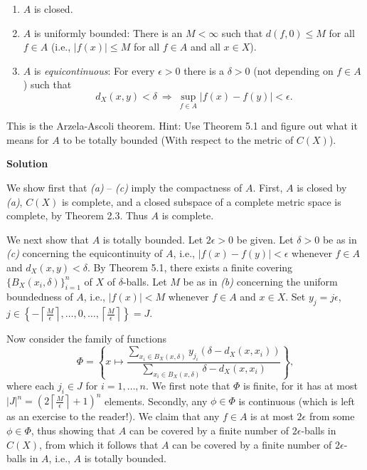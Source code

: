 \documentclass{article}
\begin{document}
\begin{enumerate}
{\begin{enumerate}
\item \(A\) is closed.
\item \(A\) is uniformly bounded:  There is an \(M < \infty\) such that \(d(f,0) \leq M\) for all \(f \in A\) (i.e., \(|f(x)| \leq M\) for all \(f \in A\) and all \(x \in X\)).
\item \(A\) is {\em equicontinuous}:  For every \(\epsilon > 0\) there is a \(\delta > 0\) (not depending on \(f \in A\)) such that
\[d_X(x,y) < \delta \ \Rightarrow \ \sup_{f \in A} |f(x) - f(y)| < \epsilon.\]
\end{enumerate}

This is the Arzela-Ascoli theorem.  Hint:  Use Theorem 5.1 and figure out what it means for \(A\) to be totally bounded (With respect to the metric of \(C(X)\)).}

{\bf Solution}

We show first that {\em (a)} -- {\em (c)} imply the compactness of \(A\).  First, \(A\) is closed by {\em (a)}, \(C(X)\) is complete, and a closed subspace of a complete metric space is complete, by Theorem 2.3.  Thus \(A\) is complete.

We next show that \(A\) is totally bounded.  Let \(2\epsilon > 0\) be given.  Let \(\delta > 0\) be as in {\em (c)} concerning the equicontinuity of \(A\), i.e., \(|f(x) - f(y)| < \epsilon\) whenever \(f \in A\) and \(d_X(x,y) < \delta\).  By Theorem 5.1, there exists a finite covering \(\{B_X(x_i,\delta)\}_{i = 1}^n\) of \(X\) of \(\delta\)-balls.  Let \(M\) be as in {\em (b)} concerning the uniform boundedness of \(A\), i.e., \(|f(x)| < M\) whenever \(f \in A\) and \(x \in X\).  Set \(y_j = j \epsilon\), \(j \in \left\{ -\left\lceil \frac{M}{\epsilon} \right\rceil, \ldots, 0, \ldots, \left\lceil \frac{M}{\epsilon} \right\rceil \right\} = J\).

Now consider the family of functions
\[\Phi = \left\{ x \mapsto \frac{\sum_{x_i \in B_X(x,\delta)} y_{j_i} (\delta - d_X(x,x_i))}{\sum_{x_i \in B_X(x,\delta)} \delta - d_X(x,x_i)} \right\},\]
where each \(j_i \in J\) for \(i = 1, \ldots, n\).  We first note that \(\Phi\) is finite, for it has at most \(|J|^n = \left( 2\left\lceil \frac{M}{\epsilon} \right\rceil + 1 \right)^n\) elements.  Secondly, any \(\phi \in \Phi\) is continuous (which is left as an exercise to the reader!).  We claim that any \(f \in A\) is at most \(2\epsilon\) from some \(\phi \in \Phi\), thus showing that \(A\) can be covered by a finite number of \(2\epsilon\)-balls in \(C(X)\), from which it follows that \(A\) can be covered by a finite number of \(2\epsilon\)-balls in \(A\), i.e., \(A\) is totally bounded.


\end{enumerate}
\end{document}
